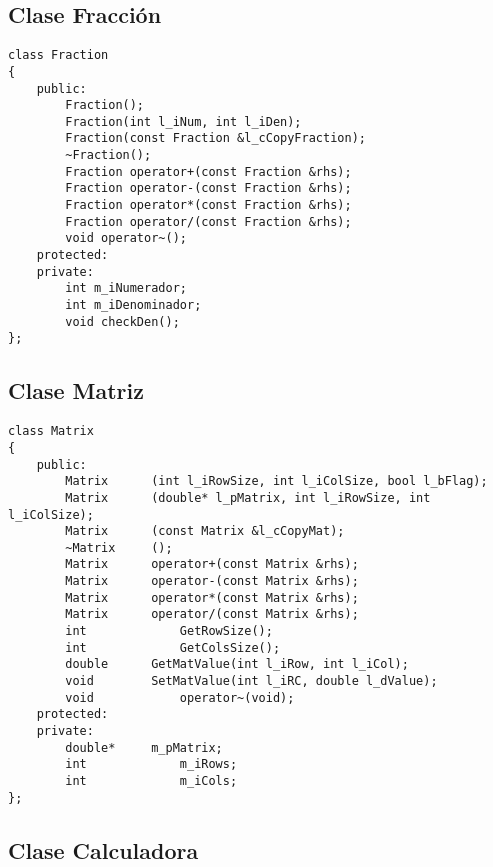\subsection{Clase Fracción}

\begin{verbatim}
class Fraction
{
	public:
		Fraction();
		Fraction(int l_iNum, int l_iDen);
		Fraction(const Fraction &l_cCopyFraction);
		~Fraction();
		Fraction operator+(const Fraction &rhs);
		Fraction operator-(const Fraction &rhs);
		Fraction operator*(const Fraction &rhs);
		Fraction operator/(const Fraction &rhs);
		void operator~();
	protected:
	private:
		int m_iNumerador;
		int m_iDenominador;
		void checkDen();
};
\end{verbatim}


\subsection{Clase Matriz}

\begin{verbatim}
class Matrix
{
	public:
		Matrix		(int l_iRowSize, int l_iColSize, bool l_bFlag);
		Matrix		(double* l_pMatrix, int l_iRowSize, int l_iColSize);
		Matrix		(const Matrix &l_cCopyMat);
		~Matrix		();
		Matrix 		operator+(const Matrix &rhs);
		Matrix 		operator-(const Matrix &rhs);
		Matrix 		operator*(const Matrix &rhs);
		Matrix 		operator/(const Matrix &rhs);
		int 			GetRowSize();
		int 			GetColsSize();
		double 		GetMatValue(int l_iRow, int l_iCol);
		void  		SetMatValue(int l_iRC, double l_dValue);
		void 			operator~(void);
	protected:
	private:
		double* 	m_pMatrix;
		int 			m_iRows;
		int 			m_iCols;
};
\end{verbatim}

\subsection{Clase Calculadora}

